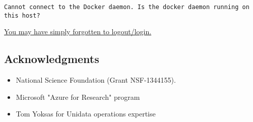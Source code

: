 \documentclass[onecolumn,9pt]{article}
\begin{document}
\begin{verbatim}
Cannot connect to the Docker daemon. Is the docker daemon running on this host?
\end{verbatim}

\hyperref[orgtarget6]{You may have simply forgotten to logout/login.}
\subsection{Acknowledgments}
\label{sec:orgheadline58}
\begin{itemize}
\item National Science Foundation (Grant NSF-1344155).
\item Microsoft "Azure for Research" program
\item Tom Yoksas for Unidata operations expertise
\end{itemize}
\end{document}
